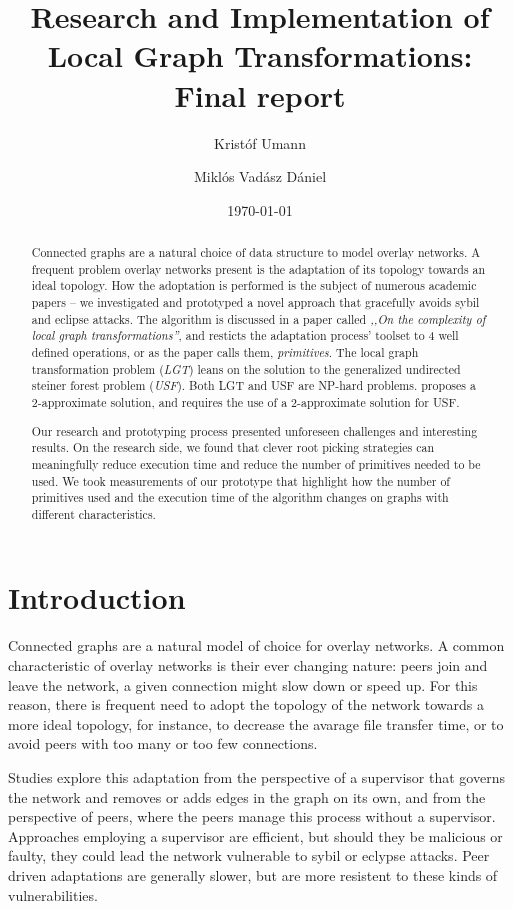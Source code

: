 \documentclass{article}
\title{Research and Implementation of Local Graph Transformations: Final report}
\author[1]{Kristóf Umann}
\author[1]{Miklós Vadász Dániel}
\affil[1]{Eötvös Loránd University, Faculty of Informatics}
\date{\today}
\begin{document}
\maketitle

\begin{abstract}
  Connected graphs are a natural choice of data structure to model overlay networks. A frequent problem overlay networks present is the adaptation of its topology towards an ideal topology. How the adoptation is performed is the subject of numerous academic papers -- we investigated and prototyped a novel approach that gracefully avoids sybil and eclipse attacks. The algorithm is discussed in a paper called \textit{,,On the complexity of local graph transformations''}\cite{ulgt}, and resticts the adaptation process' toolset to 4 well defined operations, or as the paper calls them, \textit{primitives}. The local graph transformation problem (\textit{LGT}) leans on the solution to the generalized undirected steiner forest problem (\textit{USF}). Both LGT and USF are NP-hard problems. \cite{ulgt} proposes a 2-approximate solution, and requires the use of a 2-approximate solution for USF.

  Our research and prototyping process presented unforeseen challenges and interesting results. On the research side, we found that clever root picking strategies can meaningfully reduce execution time and reduce the number of primitives needed to be used. We took measurements of our prototype that highlight how the number of primitives used and the execution time of the algorithm changes on graphs with different characteristics.
\end{abstract}

\section{Introduction}
\label{sec:introduction}

Connected graphs are a natural model of choice for overlay networks. A common characteristic of overlay networks is their ever changing nature: peers join and leave the network, a given connection might slow down or speed up. For this reason, there is frequent need to adopt the topology of the network towards a more ideal topology, for instance, to decrease the avarage file transfer time, or to avoid peers with too many or too few connections.

Studies explore this adaptation from the perspective of a supervisor that governs the network and removes or adds edges in the graph on its own, and from the perspective of peers, where the peers manage this process without a supervisor. Approaches employing a supervisor are efficient, but should they be malicious or faulty, they could lead the network vulnerable to sybil or eclypse attacks. Peer driven adaptations are generally slower, but are more resistent to these kinds of vulnerabilities.
\end{document}
